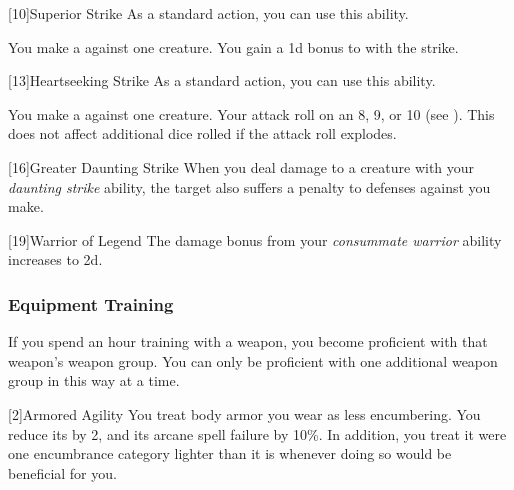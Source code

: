             [10]{Superior Strike} As a standard action, you can use this ability.
            \begin{ability}
                \begin{spelleffects}
                    \spelleffect You make a  against one creature.
                    You gain a \plus1d bonus to  with the strike.
                \end{spelleffects}
            \end{ability}

            [13]{Heartseeking Strike} As a standard action, you can use this ability.
            \begin{ability}
                \begin{spelleffects}
                    \spelleffect You make a  against one creature.
                    Your attack roll  on an 8, 9, or 10 (see ).
                    This does not affect additional dice rolled if the attack roll explodes.
                \end{spelleffects}
            \end{ability}

            [16]{Greater Daunting Strike}
            When you deal damage to a creature with your \textit{daunting strike} ability, the target also suffers a  penalty to defenses against  you make.

            [19]{Warrior of Legend}
            The damage bonus from your \textit{consummate warrior} ability increases to \plus2d.

        \subsubsection{Equipment Training}
            If you spend an hour training with a weapon, you become proficient with that weapon's weapon group.
            You can only be proficient with one additional weapon group in this way at a time.

            [2]{Armored Agility}
            You treat body armor you wear as less encumbering.
            You reduce its  by 2, and its arcane spell failure by 10\%.
            In addition, you treat it were one encumbrance category lighter than it is whenever doing so would be beneficial for you.

